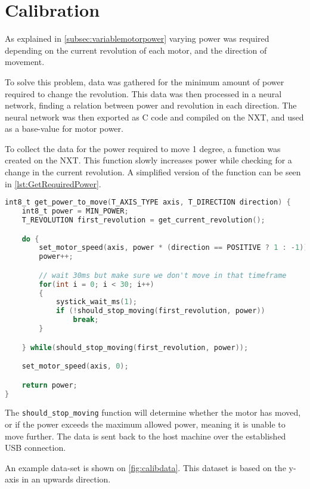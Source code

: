 \section{Calibration}\label{sec:calibration}
As explained in \autoref{subsec:variablemotorpower} varying power was required depending on the current revolution of each motor, and the direction of movement.

To solve this problem, data was gathered for the minimum amount of power required to change the revolution.
This data was then processed in a neural network, finding a relation between power and revolution in each direction.
The neural network was then exported as C code and compiled on the NXT, and used as a base-value for motor power.

To collect the data for the power required to move 1 degree, a function was created on the NXT.
This function slowly increases power while checking for a change in the current revolution. 
A simplified version of the function can be seen in \autoref{lst:GetRequiredPower}.


\begin{lstlisting}[language=C,label={lst:GetRequiredPower},caption={Getting required power to move }]
int8_t get_power_to_move(T_AXIS_TYPE axis, T_DIRECTION direction) {
	int8_t power = MIN_POWER;
	T_REVOLUTION first_revolution = get_current_revolution();

	do {
		set_motor_speed(axis, power * (direction == POSITIVE ? 1 : -1));
		power++;

		// wait 30ms but make sure we don't move in that timeframe
		for(int i = 0; i < 30; i++)
		{
			systick_wait_ms(1);
			if (!should_stop_moving(first_revolution, power))
				break;
		}

	} while(should_stop_moving(first_revolution, power));

	set_motor_speed(axis, 0);

	return power;
}

\end{lstlisting}

The \texttt{should\_stop\_moving} function will determine whether the motor has moved, or if the power exceeds the maximum allowed power, meaning it is unable to move further.
The data is sent back to the host machine over the established USB connection.


An example data-set is shown on \autoref{fig:calibdata}.
This dataset is based on the y-axis in an upwards direction.

